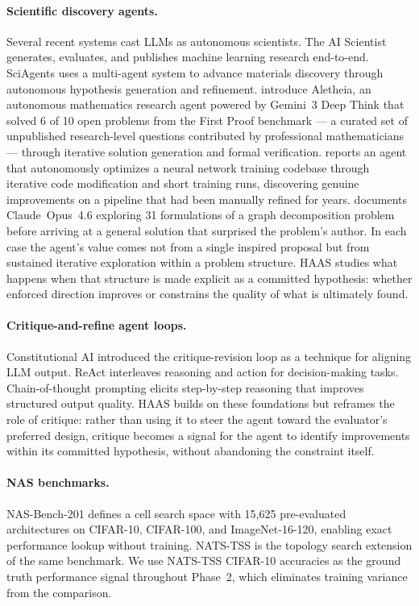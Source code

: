 \documentclass[10pt]{article}
\newcommand{\haas}{\textsc{HAAS}}
\newcommand{\nasbench}{NAS-Bench-201}
\begin{document}
\paragraph{Scientific discovery agents.}
Several recent systems cast LLMs as autonomous scientists. The AI Scientist
\citep{lu2024aiscientist} generates, evaluates, and publishes machine learning
research end-to-end. SciAgents \citep{ghafarollahi2024sciagents} uses a
multi-agent system to advance materials discovery through autonomous hypothesis
generation and refinement. \citet{feng2026aletheia} introduce Aletheia, an
autonomous mathematics research agent powered by Gemini~3 Deep Think that
solved 6 of 10 open problems from the First Proof benchmark
\citep{firstproof2026} --- a curated set of unpublished research-level
questions contributed by professional mathematicians --- through iterative
solution generation and formal verification. \citet{karpathy2026autoresearch}
reports an agent that autonomously optimizes a neural network training codebase
through iterative code modification and short training runs, discovering
genuine improvements on a pipeline that had been manually refined for years.
\citet{knuth2026claude} documents Claude~Opus~4.6 exploring 31 formulations
of a graph decomposition problem before arriving at a general solution that
surprised the problem's author. In each case the agent's value comes not from
a single inspired proposal but from sustained iterative exploration within a
problem structure. \haas{} studies what happens when that structure is made
explicit as a committed hypothesis: whether enforced direction improves or
constrains the quality of what is ultimately found.

\paragraph{Critique-and-refine agent loops.}
Constitutional AI \citep{bai2022constitutional} introduced the
critique-revision loop as a technique for aligning LLM output. ReAct
\citep{yao2023react} interleaves reasoning and action for decision-making tasks.
Chain-of-thought prompting \citep{wei2022chain} elicits step-by-step reasoning
that improves structured output quality. \haas{} builds on these foundations
but reframes the role of critique: rather than using it to steer the agent toward
the evaluator's preferred design, critique becomes a signal for the agent to
identify improvements within its committed hypothesis, without abandoning the
constraint itself.

\paragraph{NAS benchmarks.}
\nasbench{} \citep{dong2020nasbench201} defines a cell search space with 15,625
pre-evaluated architectures on CIFAR-10, CIFAR-100, and ImageNet-16-120, enabling
exact performance lookup without training. NATS-TSS \citep{dong2021nats} is the
topology search extension of the same benchmark. We use NATS-TSS CIFAR-10
accuracies as the ground truth performance signal throughout Phase~2, which
eliminates training variance from the comparison.
\end{document}
